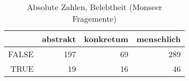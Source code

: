 \begin{table}[ht]
\centering
\begin{tabular}{rrrr}
  \hline
 & abstrakt & konkretum & menschlich \\ 
  \hline
FALSE & 197 &  69 & 289 \\ 
  TRUE &  19 &  16 &  46 \\ 
   \hline
\end{tabular}
\caption{Absolute Zahlen, Belebtheit  (Monseer Fragemente)} 
\end{table}
